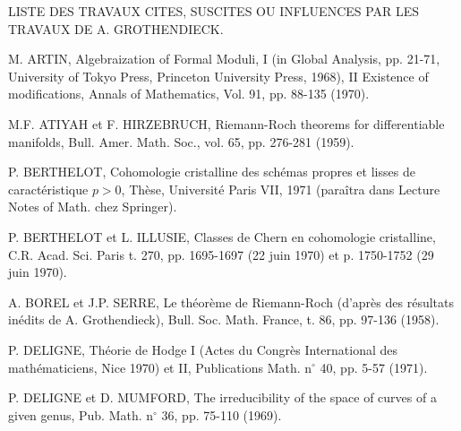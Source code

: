 
LISTE DES TRAVAUX CITES, SUSCITES OU INFLUENCES PAR
LES TRAVAUX DE A. GROTHENDIECK.

M. ARTIN, Algebraization of Formal Moduli, I (in
Global Analysis, pp. 21-71, University
of Tokyo Press, Princeton University Press,
1968), II Existence of modifications,
Annals of Mathematics, Vol. 91, pp. 88-135
(1970).

M.F. ATIYAH et F. HIRZEBRUCH, Riemann-Roch theorems
for differentiable manifolds, Bull. Amer.
Math. Soc., vol. 65, pp. 276-281 (1959).

P. BERTHELOT, Cohomologie cristalline des schémas
propres et lisses de caractéristique $p > 0$,
Thèse, Université Paris VII, 1971 (paraîtra
dans Lecture Notes of Math. chez Springer).

P. BERTHELOT et L. ILLUSIE, Classes de Chern en
cohomologie cristalline, C.R. Acad. Sci.
Paris t. 270, pp. 1695-1697 (22 juin 1970)
et p. 1750-1752 (29 juin 1970).

A. BOREL et J.P. SERRE, Le théorème de Riemann-Roch
(d'après des résultats inédits de
A. Grothendieck), Bull. Soc. Math. France,
t. 86, pp. 97-136 (1958).

P. DELIGNE, Théorie de Hodge I (Actes du Congrès
International des mathématiciens, Nice 1970)
et II, Publications Math. n$^\circ$ 40, pp. 5-57
(1971).

P. DELIGNE et D. MUMFORD, The irreducibility of
the space of curves of a given genus,
Pub. Math. n$^\circ$ 36, pp. 75-110 (1969).

